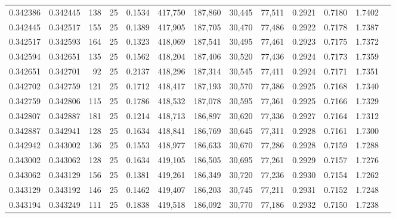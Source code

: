 \begin{tabular}{rrrrrrrrrrrrr}
0.342386 & 0.342445 &   138 &  25 &                                     0.1534 & 417,750 & 187,860 &  30,445 &  77,511 & 0.2921 & 0.7180 & 1.7402 \\
0.342445 & 0.342517 &   155 &  25 &                                     0.1389 & 417,905 & 187,705 &  30,470 &  77,486 & 0.2922 & 0.7178 & 1.7387 \\
0.342517 & 0.342593 &   164 &  25 &                                     0.1323 & 418,069 & 187,541 &  30,495 &  77,461 & 0.2923 & 0.7175 & 1.7372 \\
0.342594 & 0.342651 &   135 &  25 &                                     0.1562 & 418,204 & 187,406 &  30,520 &  77,436 & 0.2924 & 0.7173 & 1.7359 \\
0.342651 & 0.342701 &    92 &  25 &                                     0.2137 & 418,296 & 187,314 &  30,545 &  77,411 & 0.2924 & 0.7171 & 1.7351 \\
0.342702 & 0.342759 &   121 &  25 &                                     0.1712 & 418,417 & 187,193 &  30,570 &  77,386 & 0.2925 & 0.7168 & 1.7340 \\
0.342759 & 0.342806 &   115 &  25 &                                     0.1786 & 418,532 & 187,078 &  30,595 &  77,361 & 0.2925 & 0.7166 & 1.7329 \\
0.342807 & 0.342887 &   181 &  25 &                                     0.1214 & 418,713 & 186,897 &  30,620 &  77,336 & 0.2927 & 0.7164 & 1.7312 \\
0.342887 & 0.342941 &   128 &  25 &                                     0.1634 & 418,841 & 186,769 &  30,645 &  77,311 & 0.2928 & 0.7161 & 1.7300 \\
0.342942 & 0.343002 &   136 &  25 &                                     0.1553 & 418,977 & 186,633 &  30,670 &  77,286 & 0.2928 & 0.7159 & 1.7288 \\
0.343002 & 0.343062 &   128 &  25 &                                     0.1634 & 419,105 & 186,505 &  30,695 &  77,261 & 0.2929 & 0.7157 & 1.7276 \\
0.343062 & 0.343129 &   156 &  25 &                                     0.1381 & 419,261 & 186,349 &  30,720 &  77,236 & 0.2930 & 0.7154 & 1.7262 \\
0.343129 & 0.343192 &   146 &  25 &                                     0.1462 & 419,407 & 186,203 &  30,745 &  77,211 & 0.2931 & 0.7152 & 1.7248 \\
0.343194 & 0.343249 &   111 &  25 &                                     0.1838 & 419,518 & 186,092 &  30,770 &  77,186 & 0.2932 & 0.7150 & 1.7238 \\

\end{tabular}

